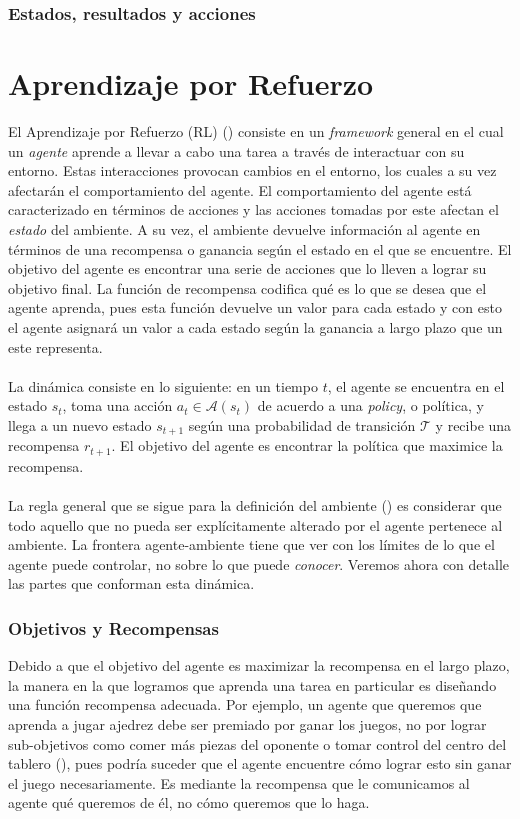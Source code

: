 \documentclass[11pt]{article}
\theoremstyle{plain}
\begin{document}
\subsubsection{Estados, resultados y acciones}
\section{Aprendizaje por Refuerzo}
El Aprendizaje por Refuerzo (RL) (\cite{sutton1998reinforcement}) consiste en un \textit{framework} general en el cual un \textit{agente} aprende a llevar a cabo una tarea a través de interactuar con su entorno. Estas interacciones provocan cambios en el entorno, los cuales a su vez afectarán el comportamiento del agente. El comportamiento del agente está caracterizado en términos de acciones y las acciones tomadas por este afectan el \textit{estado} del ambiente. A su vez, el ambiente devuelve información al agente en términos de una recompensa o ganancia según el estado en el que se encuentre. El objetivo del agente es encontrar una serie de acciones que lo lleven a lograr su objetivo final. La función de recompensa codifica qué es lo que se desea que el agente aprenda, pues esta función devuelve un valor para cada estado y con esto el agente asignará un valor a cada estado según la ganancia a largo plazo que un este representa.\\
\\
La dinámica consiste en lo siguiente: en un tiempo $t$, el agente se encuentra en el estado $s_t$, toma una acción $a_t \in \mathcal{A}(s_t)$ de acuerdo a una \textit{policy}, o política, y llega a un nuevo estado $s_{t+1}$ según una probabilidad de transición $\mathcal{T}$ y recibe una recompensa $r_{t+1}$. El objetivo del agente es encontrar la política que maximice la recompensa.\\
\\
La regla general que se sigue para la definición del ambiente (\cite{sutton1998reinforcement}) es considerar que todo aquello que no pueda ser explícitamente alterado por el agente pertenece al ambiente. La frontera agente-ambiente tiene que ver con los límites de lo que el agente puede controlar, no sobre lo que puede \textit{conocer}.
Veremos ahora con detalle las partes que conforman esta dinámica. 
\subsubsection{Objetivos y Recompensas}
Debido a que el objetivo del agente es maximizar la recompensa en el largo plazo, la manera en la que logramos que aprenda una tarea en particular es diseñando una función recompensa adecuada. Por ejemplo, un agente que queremos que aprenda a jugar ajedrez debe ser premiado por ganar los juegos, no por lograr sub-objetivos como comer más piezas del oponente o tomar control del centro del tablero (\cite{sutton1998reinforcement}), pues podría suceder que el agente encuentre cómo lograr esto sin ganar el juego necesariamente. Es mediante la recompensa que le comunicamos al agente qué queremos de él, no cómo queremos que lo haga.
\end{document}
